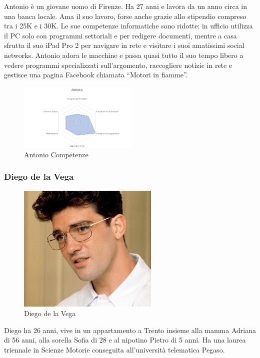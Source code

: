 \documentclass[12pt,italian,]{report}
\begin{document}
Antonio è un giovane uomo di Firenze. Ha 27 anni e lavora da un anno
circa in una banca locale. Ama il suo lavoro, forse anche grazie allo
stipendio compreso tra i 25K e i 30K. Le sue competenze informatiche
sono ridotte: in ufficio utilizza il PC solo con programmi settoriali e
per redigere documenti, mentre a casa sfrutta il suo iPad Pro 2 per
navigare in rete e visitare i suoi amatissimi social networks. Antonio
adora le macchine e passa quasi tutto il suo tempo libero a vedere
programmi specializzati sull'argomento, raccogliere notizie in rete e
gestisce una pagina Facebook chiamata ``Motori in fiamme''.

\begin{figure}[h]
\centering
\includegraphics[width=0.5\textwidth,height=\textheight]{img/antonio_competenze.png}
\caption{Antonio Competenze}
\end{figure}

\hypertarget{diego-de-la-vega-1}{%
\subsubsection{Diego de la Vega}\label{diego-de-la-vega-1}}

\begin{figure}[h]
\centering
\includegraphics[width=0.6\textwidth,height=\textheight]{img/diego.jpg}
\caption{Diego de la Vega}
\end{figure}

Diego ha 26 anni, vive in un appartamento a Trento insieme alla mamma
Adriana di 56 anni, alla sorella Sofia di 28 e al nipotino Pietro di 5
anni. Ha una laurea triennale in Scienze Motorie conseguita
all'università telematica Pegaso.
\end{document}
